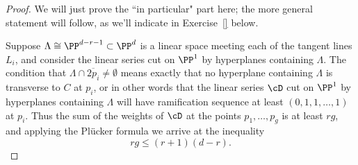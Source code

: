 \begin{proof}
We will just prove the ``in particular" part here; the more general statement will follow, as we'll indicate in Exercise~\ref{} below.

Suppose $\Lambda \cong \PP^{d-r-1} \subset \PP^d$ is a linear space meeting each of the tangent lines $L_i$, and consider the linear series cut on $\PP^1$ by hyperplanes containing $\Lambda$. The condition that $\Lambda \cap \overline{2p_i} \neq \emptyset$ means exactly that no hyperplane containing $\Lambda$ is transverse to $C$ at $p_i$, or in other words that the linear series $\cD$ cut on $\PP^1$ by hyperplanes containing $\Lambda$ will have ramification sequence at least $(0, 1, 1,\dots,1)$ at $p_i$. Thus the sum of the weights of $\cD$ at the points $p_1,\dots,p_g$ is at least $rg$, and applying the Pl\"ucker formula we arrive at the inequality
$$
rg \leq (r+1)(d-r).
$$
\end{proof}


